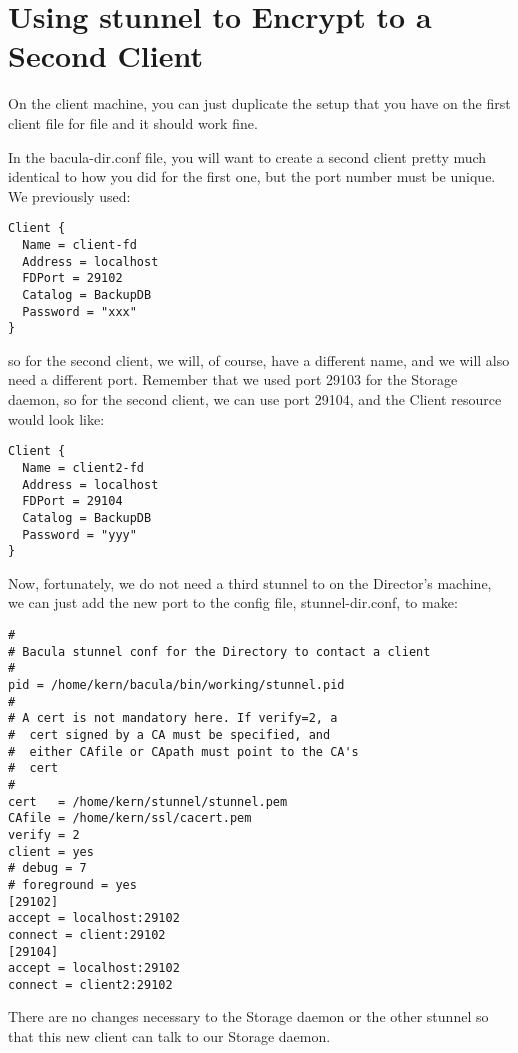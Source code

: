 \section{Using stunnel to Encrypt to a Second Client}

On the client machine, you can just duplicate the setup that you have on the
first client file for file and it should work fine.

In the bacula-dir.conf file, you will want to create a second client pretty
much identical to how you did for the first one, but the port number must be
unique. We previously used:

\footnotesize
\begin{verbatim}
Client {
  Name = client-fd
  Address = localhost
  FDPort = 29102
  Catalog = BackupDB
  Password = "xxx"
}
\end{verbatim}
\normalsize

so for the second client, we will, of course, have a different name, and we
will also need a different port. Remember that we used port 29103 for the
Storage daemon, so for the second client, we can use port 29104, and the
Client resource would look like:

\footnotesize
\begin{verbatim}
Client {
  Name = client2-fd
  Address = localhost
  FDPort = 29104
  Catalog = BackupDB
  Password = "yyy"
}
\end{verbatim}
\normalsize

Now, fortunately, we do not need a third stunnel to on the Director's machine,
we can just add the new port to the config file, stunnel-dir.conf, to make:

\footnotesize
\begin{verbatim}
#
# Bacula stunnel conf for the Directory to contact a client
#
pid = /home/kern/bacula/bin/working/stunnel.pid
#
# A cert is not mandatory here. If verify=2, a
#  cert signed by a CA must be specified, and
#  either CAfile or CApath must point to the CA's
#  cert
#
cert   = /home/kern/stunnel/stunnel.pem
CAfile = /home/kern/ssl/cacert.pem
verify = 2
client = yes
# debug = 7
# foreground = yes
[29102]
accept = localhost:29102
connect = client:29102
[29104]
accept = localhost:29102
connect = client2:29102
\end{verbatim}
\normalsize

There are no changes necessary to the Storage daemon or the other stunnel so
that this new client can talk to our Storage daemon.

